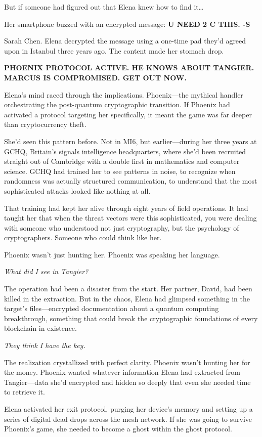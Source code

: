 \documentclass[12pt,letterpaper]{book}
\begin{document}
But if someone had figured out that Elena knew how to find it\ldots{}

Her smartphone buzzed with an encrypted message: \textbf{U NEED 2 C THIS. -S}

Sarah Chen. Elena decrypted the message using a one-time pad they'd agreed upon in Istanbul three years ago. The content made her stomach drop.

\textbf{PHOENIX PROTOCOL ACTIVE. HE KNOWS ABOUT TANGIER. MARCUS IS COMPROMISED. GET OUT NOW.}

Elena's mind raced through the implications. Phoenix---the mythical handler orchestrating the post-quantum cryptographic transition. If Phoenix had activated a protocol targeting her specifically, it meant the game was far deeper than cryptocurrency theft.

She'd seen this pattern before. Not in MI6, but earlier---during her three years at GCHQ, Britain's signals intelligence headquarters, where she'd been recruited straight out of Cambridge with a double first in mathematics and computer science. GCHQ had trained her to see patterns in noise, to recognize when randomness was actually structured communication, to understand that the most sophisticated attacks looked like nothing at all.

That training had kept her alive through eight years of field operations. It had taught her that when the threat vectors were this sophisticated, you were dealing with someone who understood not just cryptography, but the psychology of cryptographers. Someone who could think like her.

Phoenix wasn't just hunting her. Phoenix was speaking her language.

\emph{What did I see in Tangier?}

The operation had been a disaster from the start. Her partner, David, had been killed in the extraction. But in the chaos, Elena had glimpsed something in the target's files---encrypted documentation about a quantum computing breakthrough, something that could break the cryptographic foundations of every blockchain in existence.

\emph{They think I have the key.}

The realization crystallized with perfect clarity. Phoenix wasn't hunting her for the money. Phoenix wanted whatever information Elena had extracted from Tangier---data she'd encrypted and hidden so deeply that even she needed time to retrieve it.

Elena activated her exit protocol, purging her device's memory and setting up a series of digital dead drops across the mesh network. If she was going to survive Phoenix's game, she needed to become a ghost within the ghost protocol.
\end{document}
